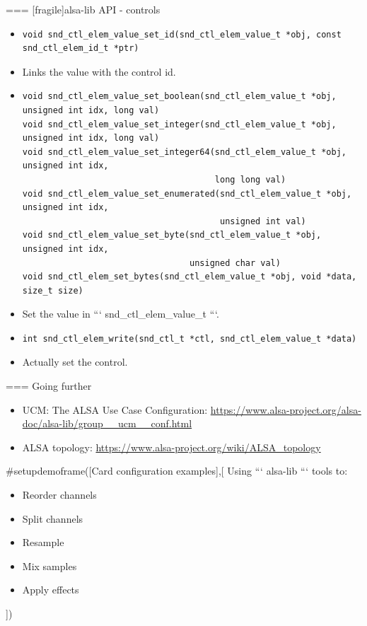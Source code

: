 === [fragile]{alsa-lib API - controls}
  \begin{itemize}
  \item
    \begin{block}{}
    \fontsize{9}{9}\selectfont
      \begin{verbatim}
void snd_ctl_elem_value_set_id(snd_ctl_elem_value_t *obj, const snd_ctl_elem_id_t *ptr)
      \end{verbatim}
    \end{block}
    \item Links the value with the control id.
  \item
    \begin{block}{}
    \fontsize{9}{9}\selectfont
      \begin{verbatim}
void snd_ctl_elem_value_set_boolean(snd_ctl_elem_value_t *obj, unsigned int idx, long val)
void snd_ctl_elem_value_set_integer(snd_ctl_elem_value_t *obj, unsigned int idx, long val)
void snd_ctl_elem_value_set_integer64(snd_ctl_elem_value_t *obj, unsigned int idx,
                                      long long val)
void snd_ctl_elem_value_set_enumerated(snd_ctl_elem_value_t *obj, unsigned int idx,
                                       unsigned int val)
void snd_ctl_elem_value_set_byte(snd_ctl_elem_value_t *obj, unsigned int idx,
                                 unsigned char val)
void snd_ctl_elem_set_bytes(snd_ctl_elem_value_t *obj, void *data, size_t size)
      \end{verbatim}
    \end{block}
  \item Set the value in ``` snd_ctl_elem_value_t ```.
  \item
    \begin{block}{}
    \fontsize{9}{9}\selectfont
      \begin{verbatim}
int snd_ctl_elem_write(snd_ctl_t *ctl, snd_ctl_elem_value_t *data)
      \end{verbatim}
    \end{block}
  \item Actually set the control.
  \end{itemize}


=== {Going further}
  \begin{itemize}
  \item UCM: The ALSA Use Case Configuration:
    \url{https://www.alsa-project.org/alsa-doc/alsa-lib/group__ucm__conf.html}
  \item ALSA topology:
    \url{https://www.alsa-project.org/wiki/ALSA_topology}
  \end{itemize}


#setupdemoframe([Card configuration examples],[
  Using ``` alsa-lib ``` tools to:
  \begin{itemize}
  \item Reorder channels
  \item Split channels
  \item Resample
  \item Mix samples
  \item Apply effects
  \end{itemize}
])

